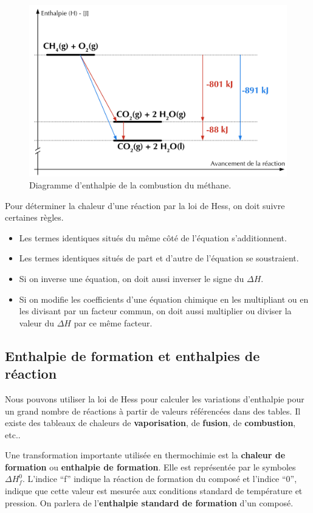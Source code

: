 \documentclass[
  11pt,
  a4paper,
  openany]{book}
\providecommand{\tightlist}{%
  \setlength{\itemsep}{0pt}\setlength{\parskip}{0pt}}
\begin{document}
\begin{figure}

{\centering \includegraphics[width=0.67\linewidth]{images/Enthalpie-2} 

}

\caption{Diagramme d'enthalpie de la combustion du méthane.}\label{fig:enthalpie-2}
\end{figure}
\clearpage

Pour déterminer la chaleur d'une réaction par la loi de Hess, on doit suivre certaines règles.

\begin{itemize}
\tightlist
\item
  Les termes identiques situés du même côté de l'équation s'additionnent.
\item
  Les termes identiques situés de part et d'autre de l'équation se soustraient.
\item
  Si on inverse une équation, on doit aussi inverser le signe du \(\Delta H\).
\item
  Si on modifie les coefficients d'une équation chimique en les multipliant ou en les divisant par un facteur commun, on doit aussi multiplier ou diviser la valeur du \(\Delta H\) par ce même facteur.
\end{itemize}

\subsection{Enthalpie de formation et enthalpies de réaction}\label{enthalpie-de-formation-et-enthalpies-de-ruxe9action}

Nous pouvons utiliser la loi de Hess pour calculer les variations d'enthalpie pour un grand nombre de réactions à partir de valeurs référencées dans des tables. Il existe des tableaux de chaleurs de \textbf{vaporisation}, de \textbf{fusion}, de \textbf{combustion}, etc..

Une transformation importante utilisée en thermochimie est la \textbf{chaleur de formation} ou \textbf{enthalpie de formation}. Elle est représentée par le symboles \(\Delta H^{0}_{f}\). L'indice ``f'' indique la réaction de formation du composé et l'indice ``0'', indique que cette valeur est mesurée aux conditions standard de température et pression. On parlera de l'\textbf{enthalpie standard de formation} d'un composé.
\end{document}
